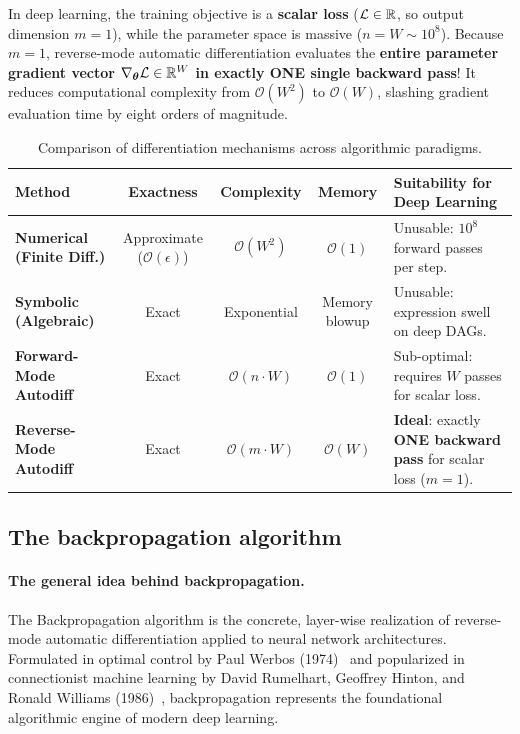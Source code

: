 In deep learning, the training objective is a \textbf{scalar loss} ($\mathcal{L} \in \mathbb{R}$, so output dimension $m = 1$), while the parameter space is massive ($n = W \sim 10^8$). Because $m = 1$, reverse-mode automatic differentiation evaluates the \textbf{entire parameter gradient vector $\nabla_{\boldsymbol{\theta}} \mathcal{L} \in \mathbb{R}^W$ in exactly ONE single backward pass}! It reduces computational complexity from $\mathcal{O}(W^2)$ to $\mathcal{O}(W)$, slashing gradient evaluation time by eight orders of magnitude.

\begin{table}[H]
\centering
\small
\setlength{\tabcolsep}{6pt}
\caption{Comparison of differentiation mechanisms across algorithmic paradigms.}
\label{tab:autodiff_comparison}
\vspace{4pt}
\begin{tabularx}{\textwidth}{l c c c >{\raggedright\arraybackslash}X}
\toprule
\textbf{Method} & \textbf{Exactness} & \textbf{Complexity} & \textbf{Memory} & \textbf{Suitability for Deep Learning} \\
\midrule
\textbf{Numerical (Finite Diff.)} & Approximate ($\mathcal{O}(\epsilon)$) & $\mathcal{O}(W^2)$ & $\mathcal{O}(1)$ & Unusable: $10^8$ forward passes per step. \\
\textbf{Symbolic (Algebraic)} & Exact & Exponential & Memory blowup & Unusable: expression swell on deep DAGs. \\
\textbf{Forward-Mode Autodiff} & Exact & $\mathcal{O}(n \cdot W)$ & $\mathcal{O}(1)$ & Sub-optimal: requires $W$ passes for scalar loss. \\
\textbf{Reverse-Mode Autodiff} & Exact & $\mathcal{O}(m \cdot W)$ & $\mathcal{O}(W)$ & \textbf{Ideal}: exactly \textbf{ONE backward pass} for scalar loss ($m=1$). \\
\bottomrule
\end{tabularx}
\end{table}

\subsection{The backpropagation algorithm}
\label{sec:four_equations_backprop}
\label{sec:vectorized_minibatch_backprop}
\label{sec:memory_footprint_caching}
\label{sec:backprop_numerical_walkthrough}

\paragraph{The general idea behind backpropagation.}
The Backpropagation algorithm is the concrete, layer-wise realization of reverse-mode automatic differentiation applied to neural network architectures. Formulated in optimal control by Paul Werbos (1974)~\cite{werbos1974beyond} and popularized in connectionist machine learning by David Rumelhart, Geoffrey Hinton, and Ronald Williams (1986)~\cite{rumelhart1986learning}, backpropagation represents the foundational algorithmic engine of modern deep learning.

